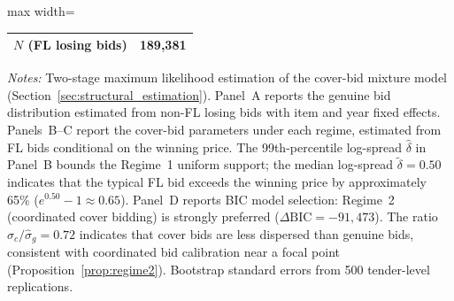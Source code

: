 \begin{table}[htbp]
\begin{adjustbox}{max width=\textwidth}
\begin{threeparttable}
\begin{tabular}{lccc}
$N$ (FL losing bids) & \multicolumn{3}{c}{189,381} \\
\bottomrule
\end{tabular}
\begin{tablenotes}
\small
\item \textit{Notes:} Two-stage maximum likelihood estimation of the cover-bid
mixture model (Section~\ref{sec:structural_estimation}). Panel~A reports the
genuine bid distribution estimated from non-FL losing bids with item and year
fixed effects. Panels~B--C report the cover-bid parameters under each regime,
estimated from FL bids conditional on the winning price. The 99th-percentile
log-spread $\hat{\delta}$ in Panel~B bounds the Regime~1 uniform support;
the median log-spread $\tilde{\delta} = 0.50$ indicates that the typical FL
bid exceeds the winning price by approximately 65\%
($e^{0.50} - 1 \approx 0.65$). Panel~D reports BIC model selection: Regime~2
(coordinated cover bidding) is strongly preferred ($\Delta\text{BIC} =
-91{,}473$). The ratio $\hat{\sigma}_c / \hat{\sigma}_g = 0.72$ indicates
that cover bids are less dispersed than genuine bids, consistent with
coordinated bid calibration near a focal point (Proposition~\ref{prop:regime2}).
Bootstrap standard errors from 500 tender-level replications.
\end{tablenotes}
\end{threeparttable}
\end{adjustbox}
\end{table}
